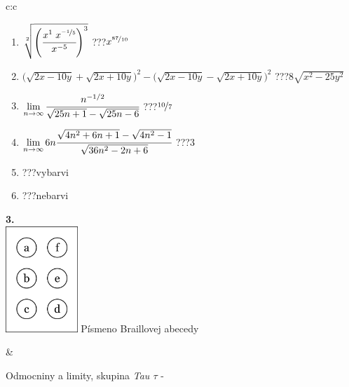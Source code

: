 \documentclass[10pt]{report}
\begin{document}
\begin{tabular}{c:c}
\begin{minipage}[c][104.5mm][t]{0.5\linewidth}
\begin{center}
\begin{minipage}{0.79\linewidth}
\begin{center}
\begin{varwidth}{\linewidth}
\begin{enumerate}
\small
\item $\sqrt[2]{\left(\cfrac{x^{1}\;x^{\nicefrac{-1}{5}}}{x^{-5}}\right)^{3}}$\quad \dotfill\; ???\;\dotfill \quad $x^{\nicefrac{87}{10}}$
\item {\footnotesize{\scriptsize$\big(\sqrt{2x-10y}+\sqrt{2x+10y}\big)^2-\big(\sqrt{2x-10y}-\sqrt{2x+10y}\big)^2$}\quad \dotfill\; ???\;\dotfill \quad $8\sqrt{x^2-25y^2}$}
\item $\lim\limits_{n\to\infty}\cfrac{n^{-1/2}}{\sqrt{25n+1}-\sqrt{25n-6}}$\quad \dotfill\; ???\;\dotfill \quad $\nicefrac{10}{7}$
\item $\lim\limits_{n\to\infty}6n\cfrac{\sqrt{4n^2+6n+1}-\sqrt{4n^2-1}}{\sqrt{36n^2-2n+6}}$\quad \dotfill\; ???\;\dotfill \quad $3$
\item \quad \dotfill\; ???\;\dotfill \quad vybarvi
\item \quad \dotfill\; ???\;\dotfill \quad nebarvi
\end{enumerate}
\end{varwidth}
\end{center}
\end{minipage}
\begin{minipage}{0.20\linewidth}
\begin{center}
{\Huge\bfseries 3.} \\[2mm]
\includegraphics[height=40mm]{../images/braille.png}
{\small Písmeno Braillovej abecedy}
\end{center}
\end{minipage}
\end{center}
\end{minipage}
&
\begin{minipage}[c][104.5mm][t]{0.5\linewidth}
\begin{center}
\vspace{7mm}
{\huge Odmocniny a limity, skupina \textit{Tau $\tau$} -}\\[5mm]

\end{center}
\end{minipage}
\end{tabular}
\end{document}
